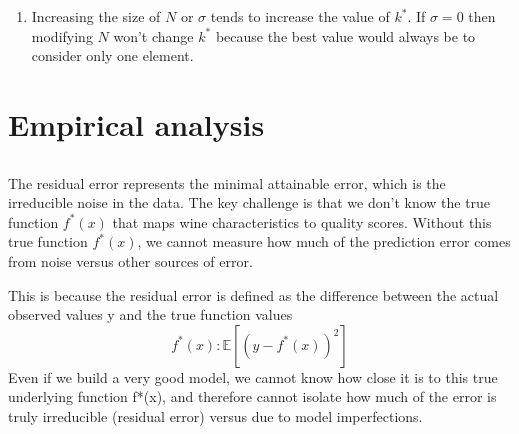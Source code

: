 \documentclass[a4paper,10pt]{article}
\begin{document}
\begin{enumerate}


    \item 
    Increasing the size of $N$ or $\sigma$ tends to increase the value of $k^*$. If $\sigma = 0$ then modifying $N$ won't change $k^*$ because the best value would always be to consider only one element.
\end{enumerate}

\section{Empirical analysis}

\subsection{}

The residual error represents the minimal attainable error, which is the irreducible noise in the data. The key challenge is that we don't know the true function $f^*(x)$ that maps wine characteristics to quality scores. Without this true function $f^*(x)$, we cannot measure how much of the prediction error comes from noise versus other sources of error.
    
    This is because the residual error is defined as the difference between the actual observed values y and the true function values \[ f^*(x): \mathbb{E}[(y - f^*(x))^2]\]
    Even if we build a very good model, we cannot know how close it is to this true underlying function f*(x), and therefore cannot isolate how much of the error is truly irreducible (residual error) versus due to model imperfections. 
    
\end{document}
